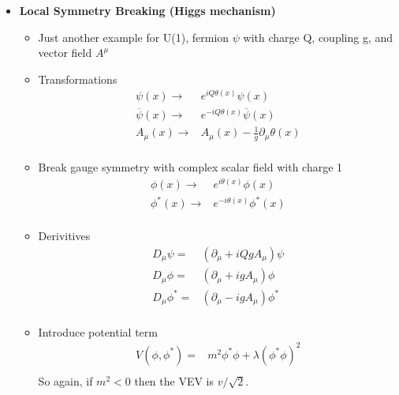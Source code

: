 \begin{itemize}
\begin{itemize}
    \end{itemize}
    \item \textbf{Local Symmetry Breaking (Higgs mechanism)} \cite{wells}
    \begin{itemize}
        \item Just another example for U(1), fermion $\psi$ with charge Q, coupling g, and vector field $A^\mu$ \cite{wells}
        \item Transformations \cite{wells}
        \begin{equation}\begin{split}
        \psi(x)\to&e^{iQ\theta(x)}\psi(x) \\
        \overline{\psi}(x)\to&e^{-iQ\theta(x)}\overline{\psi}(x) \\
        A_\mu(x)\to&A_\mu(x)-\frac{1}{g}\partial_\mu\theta(x) \\
        \end{split}\end{equation}
        \item Break gauge symmetry with complex scalar field with charge 1 \cite{wells}
        \begin{equation}\begin{split}
            \phi(x)\to&e^{i\theta(x)}\phi(x) \\
            \phi^*(x)\to&e^{-i\theta(x)}\phi^*(x) \\
        \end{split}\end{equation}
        \item Derivitives \cite{wells}
        \begin{equation}\begin{split}
        D_\mu\psi=&(\partial_\mu+iQgA_\mu)\psi \\
        D_\mu\phi=&(\partial_\mu+igA_\mu)\phi\\
        D_\mu\phi^*=&(\partial_\mu-igA_\mu)\phi^*\\
        \end{split}\end{equation}
        \item Introduce potential term \cite{wells}
        \begin{equation}\begin{split}
        V(\phi,\phi^*)=&m^2\phi^*\phi+\lambda(\phi^*\phi)^2 \\
        \end{split}\end{equation}
        So again, if $m^2<0$ then the VEV is $v/\sqrt{2}$.

\end{itemize}
\end{itemize}

